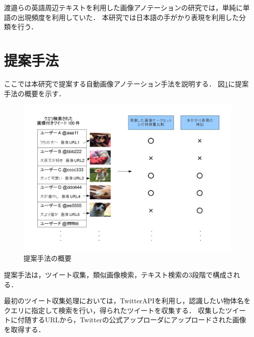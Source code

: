 \documentclass{deimj}
\begin{document}
渡邉ら\cite{watanabe}の英語周辺テキストを利用した画像アノテーションの研究では，単純に単語の出現頻度を利用していた．
本研究では日本語の手がかり表現を利用した分類を行う．



\section{提案手法}
\label{sec:way}

ここでは本研究で提案する自動画像アノテーション手法を説明する．
図\ref{fig:way}に提案手法の概要を示す．
%
\begin{figure}[tb]
 \begin{center}
  \includegraphics[scale=0.50]{way.jpg}
 \end{center}
 \caption{提案手法の概要}
 \label{fig:way}
\end{figure}
%
提案手法は，ツイート収集，類似画像検索，テキスト検索の3段階で構成される．



最初のツイート収集処理においては，TwitterAPIを利用し，認識したい物体名をクエリに指定して検索を行い，得られたツイートを収集する．
収集したツイートに付随するURLから，Twitterの公式アップローダにアップロードされた画像を取得する．
\end{document}
